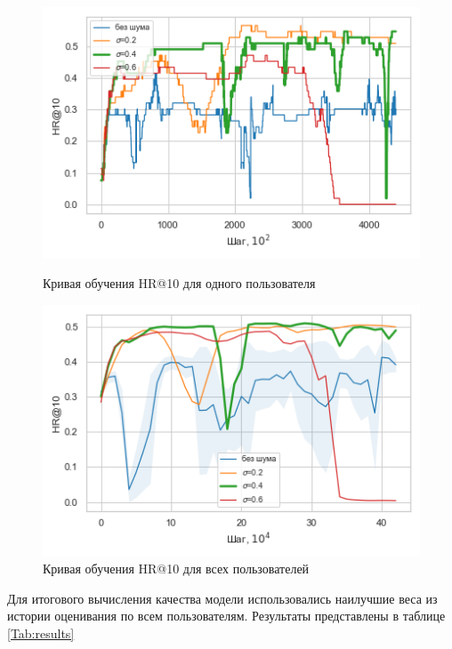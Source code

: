 \documentclass[14pt]{extarticle}
\begin{document}
\begin{figure}[H]
	\begin{minipage}[b]{0.49\textwidth}
		\centering
		\includegraphics[scale=0.55]{img/curve_hit.png}
	\caption{Кривая обучения HR@10 для одного пользователя}  
	\label{fig:hit_curve}
	\end{minipage}
	\hfill
	\begin{minipage}[b]{0.49\textwidth}
		\centering
		\includegraphics[scale=0.55]{img/curve_hit_all_.png}
	\caption{Кривая обучения HR@10 для всех пользователей}
	\label{fig:hit_curve}
	\end{minipage}
\end{figure}


Для итогового вычисления качества модели использовались наилучшие веса из истории оценивания по всем пользователям. Результаты представлены в таблице \ref{Tab:results}
\end{document}
